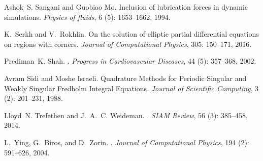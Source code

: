 \documentclass[preprint, 10pt]{elsarticle}
\begin{document}
\begin{thebibliography}{72}
Ashok~S. Sangani and Guobiao Mo.
\newblock Inclusion of lubrication forces in dynamic simulations.
\newblock \emph{Physics of fluids}, 6 (5): 1653--1662, 1994.

K.~Serkh and V.~Rokhlin.
\newblock On the solution of elliptic partial differential equations on regions
  with corners.
\newblock \emph{Journal of Computational Physics}, 305: 150--171,
  2016.

Prediman~K. Shah.
.
\newblock \emph{Progress in Cardiovascular Diseases}, 44 (5):
  357--368, 2002.

Avram Sidi and Moshe Israeli.
\newblock Quadrature {M}ethods for {P}eriodic {S}ingular and {W}eakly
  {S}ingular {F}redholm {I}ntegral {E}quations.
\newblock \emph{Journal of Scientific Computing}, 3 (2):
  201--231, 1988.

Lloyd~N. Trefethen and J.~A.~C. Weideman.
.
\newblock \emph{SIAM Review}, 56 (3): 385--458, 2014.

L.~Ying, G.~Biros, and D.~Zorin.
.
\newblock \emph{Journal of Computational Physics}, 194 (2):
  591--626, 2004.

\end{thebibliography}


%
\end{document}
